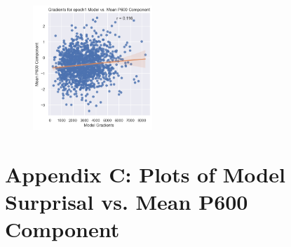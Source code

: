 \documentclass{IEEEtran}
\begin{document}
\begin{figure}[h]
    \centering
    \includegraphics[width=0.4\textwidth]{gradients_vs_p600/epoch1.png}
\end{figure}

\clearpage

\section*{Appendix C: Plots of Model Surprisal vs. Mean P600 Component}
\end{document}
